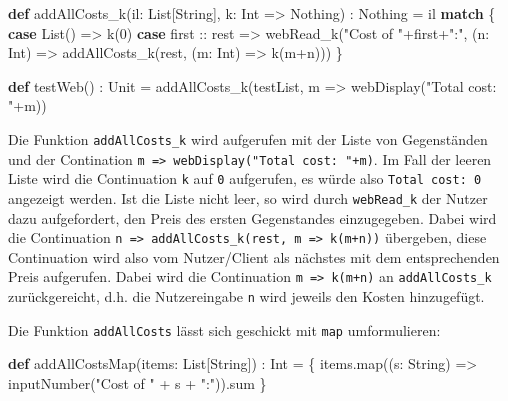 \documentclass[]{article}
\newenvironment{Shaded}{}{}
\newcommand{\DecValTok}[1]{\textcolor[rgb]{0.25,0.63,0.44}{#1}}
\newcommand{\FunctionTok}[1]{\textcolor[rgb]{0.02,0.16,0.49}{#1}}
\newcommand{\KeywordTok}[1]{\textcolor[rgb]{0.00,0.44,0.13}{\textbf{#1}}}
\newcommand{\NormalTok}[1]{#1}
\newcommand{\StringTok}[1]{\textcolor[rgb]{0.25,0.44,0.63}{#1}}
\begin{document}
\begin{Shaded}
\begin{Highlighting}[]
\KeywordTok{def} \FunctionTok{addAllCosts\_k}\NormalTok{(il: List[String], k: Int =\textgreater{} Nothing) : Nothing = il }\KeywordTok{match}\NormalTok{ \{}
  \KeywordTok{case}\NormalTok{ List() =\textgreater{} }\FunctionTok{k}\NormalTok{(}\DecValTok{0}\NormalTok{)}
  \KeywordTok{case}\NormalTok{ first :: rest =\textgreater{}}
    \FunctionTok{webRead\_k}\NormalTok{(}\StringTok{"Cost of "}\NormalTok{+first+}\StringTok{":"}\NormalTok{,}
\NormalTok{      (n: Int) =\textgreater{} }\FunctionTok{addAllCosts\_k}\NormalTok{(rest, (m: Int) =\textgreater{} }\FunctionTok{k}\NormalTok{(m+n)))}
\NormalTok{\}}

\KeywordTok{def} \FunctionTok{testWeb}\NormalTok{() : Unit = }\FunctionTok{addAllCosts\_k}\NormalTok{(testList, m =\textgreater{} }\FunctionTok{webDisplay}\NormalTok{(}\StringTok{"Total cost: "}\NormalTok{+m))}
\end{Highlighting}
\end{Shaded}

Die Funktion \texttt{addAllCosts\_k} wird aufgerufen mit der Liste von
Gegenständen und der Contination
\texttt{m\ =\textgreater{}\ webDisplay("Total\ cost:\ "+m)}. Im Fall der
leeren Liste wird die Continuation \texttt{k} auf \texttt{0} aufgerufen,
es würde also \texttt{Total\ cost:\ 0} angezeigt werden. Ist die Liste
nicht leer, so wird durch \texttt{webRead\_k} der Nutzer dazu
aufgefordert, den Preis des ersten Gegenstandes einzugegeben. Dabei wird
die Continuation
\texttt{n\ =\textgreater{}\ addAllCosts\_k(rest,\ m\ =\textgreater{}\ k(m+n))}
übergeben, diese Continuation wird also vom Nutzer/Client als nächstes
mit dem entsprechenden Preis aufgerufen. Dabei wird die Continuation
\texttt{m\ =\textgreater{}\ k(m+n)} an \texttt{addAllCosts\_k}
zurückgereicht, d.h. die Nutzereingabe \texttt{n} wird jeweils den
Kosten hinzugefügt.

Die Funktion \texttt{addAllCosts} lässt sich geschickt mit \texttt{map}
umformulieren:

\begin{Shaded}
\begin{Highlighting}[]
\KeywordTok{def} \FunctionTok{addAllCostsMap}\NormalTok{(items: List[String]) : Int = \{}
\NormalTok{  items.}\FunctionTok{map}\NormalTok{((s: String) =\textgreater{} }\FunctionTok{inputNumber}\NormalTok{(}\StringTok{"Cost of "}\NormalTok{ + s + }\StringTok{":"}\NormalTok{)).}\FunctionTok{sum}
\NormalTok{\}}
\end{Highlighting}
\end{Shaded}
\end{document}
